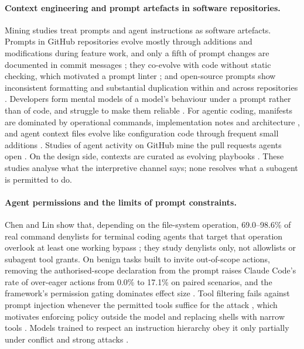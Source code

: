 \paragraph{Context engineering and prompt artefacts in software repositories.}
\label{sec:rw-context}
Mining studies treat prompts and agent instructions as software artefacts. Prompts in GitHub repositories evolve mostly
through additions and modifications during feature work, and only a fifth of prompt changes are documented in commit
messages \citep{tafreshipour2025prompting}; they co-evolve with code without static checking, which motivated a prompt
linter \citep{pister2024promptset}; and open-source prompts show inconsistent formatting and substantial duplication
within and across repositories \citep{li2026promptmanagement}. Developers form mental models of a model's behaviour
under a prompt rather than of code, and struggle to make them reliable \citep{liang2025promptsareprograms}. For agentic
coding,  manifests are dominated by operational commands, implementation notes and architecture
\citep{Chatlatanagulchai2025Manifests}, and agent context files evolve like configuration code through frequent small
additions \citep{Chatlatanagulchai2026AgentREADMEs}. Studies of agent activity on GitHub mine the pull requests agents
open \citep{Li2026AIDev}. On the design side, contexts are curated as evolving playbooks \citep{zhang2026ace}. These
studies analyse what the interpretive channel says; none resolves what a subagent is permitted to do.

\paragraph{Agent permissions and the limits of prompt constraints.}
\label{sec:rw-security}
Chen and Lin show that, depending on the file-system operation, 69.0--98.6\% of real command denylists for terminal
coding agents that target that operation overlook at least one working bypass \citep{Chen2026Denylist}; they study
denylists only, not allowlists or subagent tool grants. On benign tasks built to invite out-of-scope actions, removing the
authorised-scope declaration from the prompt raises Claude Code's rate of over-eager actions from 0.0\% to 17.1\% on
paired scenarios, and the framework's permission gating dominates effect size \citep{qu2026overeager}. Tool filtering fails against prompt injection whenever the permitted tools suffice for the attack
\citep{debenedetti2024agentdojo}, which motivates enforcing policy outside the model
\citep{debenedetti2025defeating,shi2025progent} and replacing shells with narrow tools \citep{beurerkellner2025design}.
Models trained to respect an instruction hierarchy obey it only partially under conflict and strong attacks
\citep{wallace2024hierarchy,geng2026controlillusion}.

